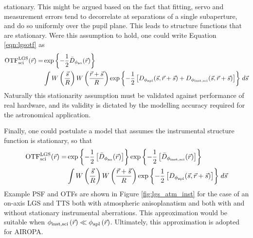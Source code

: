 stationary.  This might be argued based on the fact that fitting,
servo and measurement errors tend to decorrelate at separations of a
single subaperture, and do so uniformly over the pupil plane.  This
leads to structure functions that are stationary.  Were this
assumption to hold, one could write Equation \ref{eqn:lgsotf} as
\begin{equation}\label{eqn:lgsotfb}
\begin{aligned}
{\rm OTF}^{\rm LGS}_{\rm sci}(\vec{r}) = 
& \exp{
\left\{ -\frac{1}{2} \bar{D}_{\rm \phi_{\rm ao}}(\vec{r}) \right\}}  \\
& \int 
W \left( \frac{\vec{s}}{R} \right)
W \left( \frac{\vec{r} + \vec{s}}{R} \right)
\exp{ \left\{ -\frac{1}{2} \left[
D_{\rm \phi_{apl}}(\vec{s}, \vec{r} + \vec{s}) +
D_{\rm \phi_{inst,sci}}(\vec{s}, \vec{r} + \vec{s})
\right] \right\} }
\; d\vec{s} 
\end{aligned}
\end{equation}
Naturally this stationarity assumption must be validated against
performance of real hardware, and its validity is dictated by the
modelling accuracy required for the astronomical application.  

Finally, one could postulate a model that assumes the instrumental
structure function is stationary, so that
\begin{equation}\label{eqn:lgsotfc}
\begin{aligned}
{\rm OTF}^{\rm LGS}_{\rm sci}(\vec{r}) = 
& \exp{ \left\{ -\frac{1}{2}
\left[ \bar{D}_{\rm \phi_{\rm ao}}(\vec{r}) \right] \right\} } 
\exp{ \left\{ -\frac{1}{2}
\left[ \bar{D}_{\rm \phi_{\rm inst,sci}}(\vec{r}) \right] \right\} }  \\
& \int 
W \left( \frac{\vec{s}}{R} \right)
W \left( \frac{\vec{r} + \vec{s}}{R} \right)
\exp{ \left\{ -\frac{1}{2} \left[
D_{\rm \phi_{apl}}(\vec{s},\vec{r} + \vec{s})
\right] \right\} }
\; d\vec{s} 
\end{aligned}
\end{equation}
Example PSF and OTFs are shown in Figure \ref{fig:lgs_atm_inst} for
the case of an on-axis LGS and TTS both with atmospheric
anisoplanatism and both with and without stationary instrumental 
aberrations. This approximation would be suitable when 
$\phi_{\rm inst,sci} \left( \vec{r} \right) \ll 
\phi_{\rm apl} \left( \vec{r} \right)$. Ultimately, 
this approximation is adopted for AIROPA.


